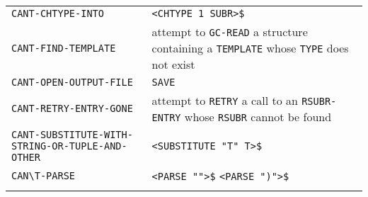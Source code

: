 \documentclass[a4paper]{scrbook}
\begin{document}
\begin{longtable}[]{@{}ll@{}}
\begin{minipage}[t]{0.58\columnwidth}
\texttt{CANT-CHTYPE-INTO}\strut
\end{minipage} & \begin{minipage}[t]{0.36\columnwidth}\raggedright\strut
\texttt{\textless{}CHTYPE\ 1\ SUBR\textgreater{}\$}\strut
\end{minipage}\tabularnewline
\begin{minipage}[t]{0.58\columnwidth}\raggedright\strut
\texttt{CANT-FIND-TEMPLATE}\strut
\end{minipage} & \begin{minipage}[t]{0.36\columnwidth}\raggedright\strut
attempt to \texttt{GC-READ} a structure containing a \texttt{TEMPLATE} whose \texttt{TYPE} does not exist\strut
\end{minipage}\tabularnewline
\begin{minipage}[t]{0.58\columnwidth}\raggedright\strut
\texttt{CANT-OPEN-OUTPUT-FILE}\strut
\end{minipage} & \begin{minipage}[t]{0.36\columnwidth}\raggedright\strut
\texttt{SAVE}\strut
\end{minipage}\tabularnewline
\begin{minipage}[t]{0.58\columnwidth}\raggedright\strut
\texttt{CANT-RETRY-ENTRY-GONE}\strut
\end{minipage} & \begin{minipage}[t]{0.36\columnwidth}\raggedright\strut
attempt to \texttt{RETRY} a call to an \texttt{RSUBR-ENTRY} whose \texttt{RSUBR} cannot be found\strut
\end{minipage}\tabularnewline
\begin{minipage}[t]{0.58\columnwidth}\raggedright\strut
\texttt{CANT-SUBSTITUTE-WITH-STRING-OR-TUPLE-AND-OTHER}\strut
\end{minipage} & \begin{minipage}[t]{0.36\columnwidth}\raggedright\strut
\texttt{\textless{}SUBSTITUTE\ "T"\ T\textgreater{}\$}\strut
\end{minipage}\tabularnewline
\begin{minipage}[t]{0.58\columnwidth}\raggedright\strut
\texttt{CAN\textbackslash{}\textquotesingle{}T-PARSE}\strut
\end{minipage} & \begin{minipage}[t]{0.36\columnwidth}\raggedright\strut
\texttt{\textless{}PARSE\ ""\textgreater{}\$} \texttt{\textless{}PARSE\ ")"\textgreater{}\$}\strut
\end{minipage}\tabularnewline
\begin{minipage}[t]{0.58\columnwidth}\raggedright\strut

\end{minipage}
\end{longtable}
\end{document}
